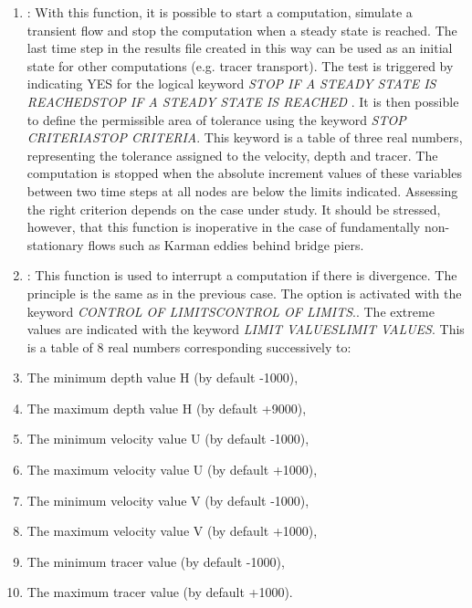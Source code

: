 \documentclass{article} %
\begin{document}
\begin{enumerate}
\item  {}: With this function, it is possible to start a computation, simulate a transient flow and stop the computation when a steady state is reached. The last time step in the results file created in this way can be used as an initial state for other computations (e.g. tracer transport). The test is triggered by indicating YES for the logical keyword \textit{STOP IF A STEADY STATE IS REACHEDSTOP IF A STEADY STATE IS REACHED} . It is then possible to define the permissible area of tolerance using the keyword \textit{STOP CRITERIASTOP CRITERIA}. This keyword is a table of three real numbers, representing the tolerance assigned to the velocity, depth and tracer. The computation is stopped when the absolute increment values of these variables between two time steps at all nodes are below the limits indicated. Assessing the right criterion depends on the case under study. It should be stressed, however, that this function is inoperative in the case of fundamentally non-stationary flows such as Karman eddies behind bridge piers.

\item  {}: This function is used to interrupt a computation if there is divergence. The principle is the same as in the previous case. The option is activated with the keyword \textit{CONTROL OF LIMITSCONTROL OF LIMITS}.. The extreme values are indicated with the keyword \textit{LIMIT VALUESLIMIT VALUES}. This is a table of 8 real numbers corresponding successively to:

\item  The minimum depth value H (by default -1000),

\item  The maximum depth value H (by default +9000),

\item  The minimum velocity value U (by default -1000),

\item  The maximum velocity value U (by default +1000),

\item  The minimum velocity value V (by default -1000),

\item  The maximum velocity value V (by default +1000),

\item  The minimum tracer value (by default -1000),

\item  The maximum tracer value (by default +1000).
\end{enumerate}
\end{document}
